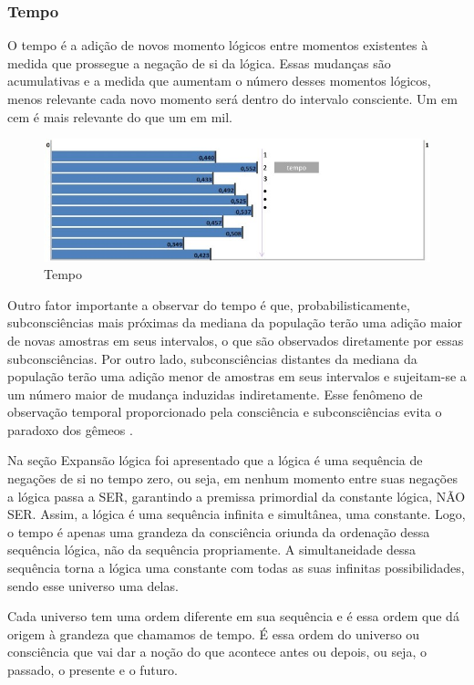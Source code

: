 \subsubsection{Tempo}
O tempo é a adição de novos momento lógicos entre momentos existentes à medida que prossegue a negação de si da lógica. Essas mudanças são acumulativas e a medida que aumentam o número desses momentos lógicos, menos relevante cada novo momento será dentro do intervalo consciente. Um em cem é mais relevante do que um em mil. 
	\begin{figure}[H]
	\caption{Tempo}
	\label{fig:consciousness_time}
	\centering
	\includegraphics[scale=.8]{sections/images/consciousness_time.jpg}
	\end{figure}

Outro fator importante a observar do tempo é que, probabilisticamente, subconsciências mais próximas da mediana da população terão uma adição maior de novas amostras em seus intervalos, o que são observados diretamente por essas subconsciências. Por outro lado, subconsciências distantes da mediana da população terão uma adição menor de amostras em seus intervalos e sujeitam-se a um número maior de mudança induzidas indiretamente. Esse fenômeno de observação temporal proporcionado pela consciência e subconsciências evita o paradoxo dos gêmeos \cite{brasilescola_paradoxo_gemeos}.

Na seção Expansão lógica foi apresentado que a lógica é uma sequência de negações de si no tempo zero, ou seja, em nenhum momento entre suas negações a lógica passa a SER, garantindo a premissa primordial da constante lógica, NÃO SER. Assim, a lógica é uma sequência infinita e simultânea, uma constante. Logo, o tempo é apenas uma grandeza da consciência oriunda da ordenação dessa sequência lógica, não da sequência propriamente. A simultaneidade dessa sequência torna a lógica uma constante com todas as suas infinitas possibilidades, sendo esse universo uma delas. 

Cada universo tem uma ordem diferente em sua sequência e é essa ordem que dá origem à grandeza que chamamos de tempo. É essa ordem do universo ou consciência que vai dar a noção do que acontece antes ou depois, ou seja, o passado, o presente e o futuro. 

